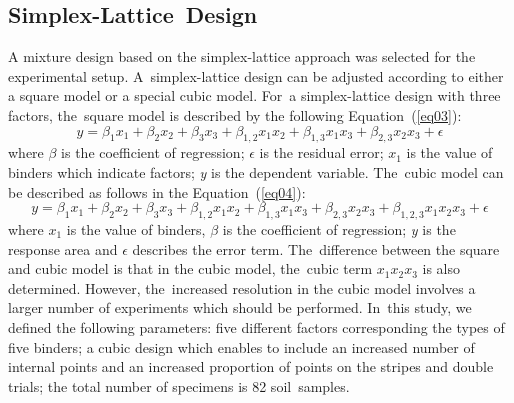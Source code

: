 \documentclass[constrmater,article,accept,pdftex,moreauthors]{Definitions/mdpi}
\begin{document}
\subsection{Simplex-Lattice~Design}
A mixture design based on the simplex-lattice approach was selected for the experimental setup. A~simplex-lattice design can be adjusted according to either a square model or a special cubic model.  For~a simplex-lattice design with three factors, the~square model is described by the following Equation~(\ref{eq03}):
\begin{equation}\label{eq03}
	y = \beta _1 x_1 +  \beta _2  x_2 +  \beta _3  x_3 + \beta _{1,2} x_1 x_2 + \beta _{1,3} x_1 x_3 + \beta _{2,3} x_2 x_3 + \epsilon
\end{equation}
where $\beta$ is the coefficient of regression; $\epsilon$ is the residual error; $x_1$ is the value of binders which indicate factors; \emph{y} %
 is the dependent variable. The~cubic model can be described as follows in the Equation~(\ref{eq04}):
\begin{equation}\label{eq04}
	y = \beta _1 x_1 + \beta _2 x_2 + \beta _3 x_3 + \beta _{1,2} x_1 x_2 + \beta _{1,3} x_1 x_3 + \beta _{2,3} x_2 x_3  + \beta _{1,2,3} x_1 x_2 x_3 + \epsilon
\end{equation}
where $x_1$ is the value of binders, $\beta$ is the coefficient of regression; \emph{y} is the response area and $\epsilon$ describes the error term.  The~difference between the square and cubic model is that in the cubic model, the~cubic term $x_1 x_2 x_3$ is also determined. However, the~increased resolution in the cubic model involves a larger number of experiments which should be performed. In~this study, we defined the following parameters: five different factors corresponding the types of five binders; a cubic design which enables to include an increased number of internal points and an increased proportion of points on the stripes %
and double trials; the total number of specimens is 82 soil~samples.
\end{document}
